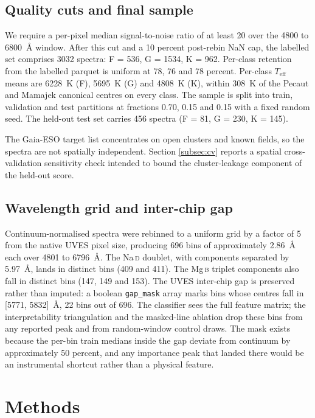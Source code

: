 \documentclass[11pt,a4paper]{article}
\newcommand{\Mgb}{Mg\,\textsc{b}\xspace}
\newcommand{\NaD}{Na\,\textsc{d}\xspace}
\newcommand{\Teff}{$T_{\mathrm{eff}}$\xspace}
\begin{document}
\subsection{Quality cuts and final sample}

We require a per-pixel median signal-to-noise ratio of at least 20 over the 4800 to 6800~\AA{} window. After this cut and a 10 percent post-rebin NaN cap, the labelled set comprises 3032 spectra: F = 536, G = 1534, K = 962. Per-class retention from the labelled parquet is uniform at 78, 76 and 78 percent. Per-class \Teff means are 6228~K (F), 5695~K (G) and 4808~K (K), within 308~K of the Pecaut and Mamajek canonical centres on every class. The sample is split into train, validation and test partitions at fractions 0.70, 0.15 and 0.15 with a fixed random seed. The held-out test set carries 456 spectra (F = 81, G = 230, K = 145).

The Gaia-ESO target list concentrates on open clusters and known fields, so the spectra are not spatially independent. Section \ref{subsec:cv} reports a spatial cross-validation sensitivity check intended to bound the cluster-leakage component of the held-out score.

\subsection{Wavelength grid and inter-chip gap}
\label{subsec:wavelength-grid}

Continuum-normalised spectra were rebinned to a uniform grid by a factor of 5 from the native UVES pixel size, producing 696 bins of approximately 2.86~\AA{} each over 4801 to 6796~\AA{}. The \NaD doublet, with components separated by 5.97~\AA{}, lands in distinct bins (409 and 411). The \Mgb triplet components also fall in distinct bins (147, 149 and 153). The UVES inter-chip gap is preserved rather than imputed: a boolean \texttt{gap\_mask} array marks bins whose centres fall in [5771, 5832]~\AA{}, 22 bins out of 696. The classifier sees the full feature matrix; the interpretability triangulation and the masked-line ablation drop these bins from any reported peak and from random-window control draws. The mask exists because the per-bin train medians inside the gap deviate from continuum by approximately 50 percent, and any importance peak that landed there would be an instrumental shortcut rather than a physical feature.

\section{Methods}
\label{sec:methods}
\end{document}
